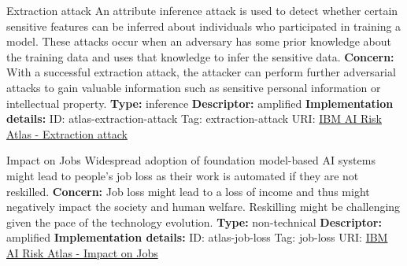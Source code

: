 \documentclass[a4paper,12pt]{article}
\begin{document}
\begin{definitionbox}{Extraction attack}
An attribute inference attack is used to detect whether certain sensitive features can be inferred about individuals who participated in training a model. These attacks occur when an adversary has some prior knowledge about the training data and uses that knowledge to infer the sensitive data.\newline\newline
\textbf{Concern: }With a successful extraction attack, the attacker can perform further adversarial attacks to gain valuable information such as sensitive personal information or intellectual property.\newline\newline
\textbf{Type: }inference\newline
\textbf{Descriptor: }amplified \newline\newline
\textbf{Implementation details: } \newline
ID: atlas-extraction-attack \newline
Tag: extraction-attack \newline
URI:  \href{https://www.ibm.com/docs/en/watsonx/saas?topic=SSYOK8/wsj/ai-risk-atlas/extraction-attack.html}{IBM AI Risk Atlas - Extraction attack}\newline
\end{definitionbox}
\begin{definitionbox}{Impact on Jobs}
Widespread adoption of foundation model-based AI systems might lead to people's job loss as their work is automated if they are not reskilled.\newline\newline
\textbf{Concern: }Job loss might lead to a loss of income and thus might negatively impact the society and human welfare. Reskilling might be challenging given the pace of the technology evolution.\newline\newline
\textbf{Type: }non-technical\newline
\textbf{Descriptor: }amplified \newline\newline
\textbf{Implementation details: } \newline
ID: atlas-job-loss \newline
Tag: job-loss \newline
URI:  \href{https://www.ibm.com/docs/en/watsonx/saas?topic=SSYOK8/wsj/ai-risk-atlas/job-loss.html}{IBM AI Risk Atlas - Impact on Jobs}\newline
\end{definitionbox}
\end{document}
